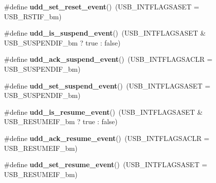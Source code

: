 \begin{DoxyCompactItemize}
\item 
\hypertarget{group__udd__xmega__usb__group_ga1e1d2efe56473014a72df19df90082b5}{\#define {\bfseries udd\-\_\-set\-\_\-reset\-\_\-event}()~(U\-S\-B\-\_\-\-I\-N\-T\-F\-L\-A\-G\-S\-A\-S\-E\-T = U\-S\-B\-\_\-\-R\-S\-T\-I\-F\-\_\-bm)}\label{group__udd__xmega__usb__group_ga1e1d2efe56473014a72df19df90082b5}

\item 
\hypertarget{group__udd__xmega__usb__group_ga3880e30ef3f0547db72dce1a7e98d249}{\#define {\bfseries udd\-\_\-is\-\_\-suspend\-\_\-event}()~(U\-S\-B\-\_\-\-I\-N\-T\-F\-L\-A\-G\-S\-A\-S\-E\-T \& U\-S\-B\-\_\-\-S\-U\-S\-P\-E\-N\-D\-I\-F\-\_\-bm ? true \-: false)}\label{group__udd__xmega__usb__group_ga3880e30ef3f0547db72dce1a7e98d249}

\item 
\hypertarget{group__udd__xmega__usb__group_ga342f3fb6a2837adb5f993f73daa84af0}{\#define {\bfseries udd\-\_\-ack\-\_\-suspend\-\_\-event}()~(U\-S\-B\-\_\-\-I\-N\-T\-F\-L\-A\-G\-S\-A\-C\-L\-R = U\-S\-B\-\_\-\-S\-U\-S\-P\-E\-N\-D\-I\-F\-\_\-bm)}\label{group__udd__xmega__usb__group_ga342f3fb6a2837adb5f993f73daa84af0}

\item 
\hypertarget{group__udd__xmega__usb__group_ga3e08da29f93f12f7e8fe2e67912ceb07}{\#define {\bfseries udd\-\_\-set\-\_\-suspend\-\_\-event}()~(U\-S\-B\-\_\-\-I\-N\-T\-F\-L\-A\-G\-S\-A\-S\-E\-T = U\-S\-B\-\_\-\-S\-U\-S\-P\-E\-N\-D\-I\-F\-\_\-bm)}\label{group__udd__xmega__usb__group_ga3e08da29f93f12f7e8fe2e67912ceb07}

\item 
\hypertarget{group__udd__xmega__usb__group_ga1362bf05c27afb84e8584abc7f13fd2b}{\#define {\bfseries udd\-\_\-is\-\_\-resume\-\_\-event}()~(U\-S\-B\-\_\-\-I\-N\-T\-F\-L\-A\-G\-S\-A\-S\-E\-T \& U\-S\-B\-\_\-\-R\-E\-S\-U\-M\-E\-I\-F\-\_\-bm ? true \-: false)}\label{group__udd__xmega__usb__group_ga1362bf05c27afb84e8584abc7f13fd2b}

\item 
\hypertarget{group__udd__xmega__usb__group_gaeafd1cb56aa572af8d01243295d17458}{\#define {\bfseries udd\-\_\-ack\-\_\-resume\-\_\-event}()~(U\-S\-B\-\_\-\-I\-N\-T\-F\-L\-A\-G\-S\-A\-C\-L\-R = U\-S\-B\-\_\-\-R\-E\-S\-U\-M\-E\-I\-F\-\_\-bm)}\label{group__udd__xmega__usb__group_gaeafd1cb56aa572af8d01243295d17458}

\item 
\hypertarget{group__udd__xmega__usb__group_gaf67be3196d7036613435a91676ad1072}{\#define {\bfseries udd\-\_\-set\-\_\-resume\-\_\-event}()~(U\-S\-B\-\_\-\-I\-N\-T\-F\-L\-A\-G\-S\-A\-S\-E\-T = U\-S\-B\-\_\-\-R\-E\-S\-U\-M\-E\-I\-F\-\_\-bm)}\label{group__udd__xmega__usb__group_gaf67be3196d7036613435a91676ad1072}


\end{DoxyCompactItemize}
